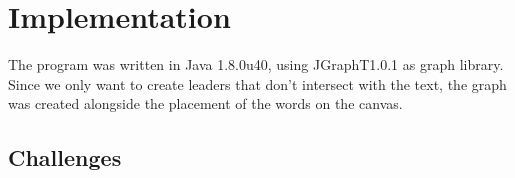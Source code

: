 \documentclass[11pt,a4paper]{vutinfth}
\begin{document}


\chapter{Implementation}
The program was written in Java 1.8.0u40, using JGraphT1.0.1\cite{JGraphT} as graph library. Since we only want to create leaders that don't intersect with the text, the graph was created alongside the placement of the words on the canvas.%
\section{Challenges}
\end{document}
